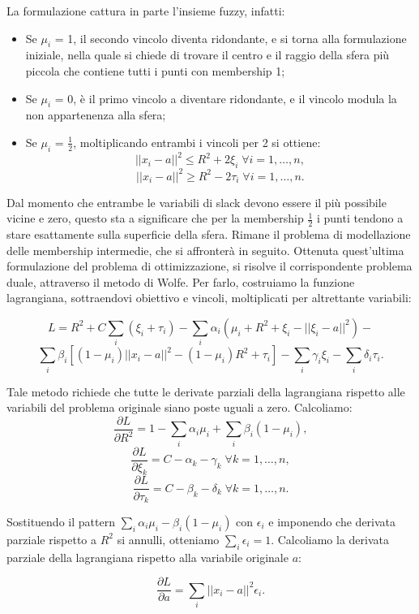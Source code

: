 \documentclass[12pt,a4paper]{report}
\begin{document}
La formulazione cattura in parte l'insieme fuzzy, infatti:
\begin{itemize}
  \item Se  $\mu_i$ = 1, il secondo vincolo diventa ridondante, e si torna alla formulazione iniziale, nella quale si chiede di trovare il centro  e il raggio della sfera più piccola che contiene tutti i punti con membership 1;
  \item Se   $\mu_i$ = 0, è il primo vincolo a diventare ridondante, e il vincolo modula la non appartenenza alla sfera;		
  \item Se   $\mu_i$ = $\frac{1}{2}$, moltiplicando entrambi i vincoli per 2 si ottiene:
\[ ||x_i - a||^2  \leq R^2 + 2\xi_{i} \; \forall i = 1, \dots, n,\]
\[ ||x_i - a||^2  \geq R^2 - 2\tau_{i}\; \forall i = 1, \dots, n.\]
\end{itemize}

Dal momento che entrambe le variabili di slack devono essere il più possibile vicine e zero, questo sta a significare che per la membership  $\frac{1}{2}$ i punti tendono a stare esattamente sulla superficie della sfera. Rimane il problema di modellazione delle membership intermedie, che si affronterà in seguito.
Ottenuta quest'ultima formulazione del problema di ottimizzazione, si risolve il corrispondente problema duale, attraverso il metodo di Wolfe. Per farlo, costruiamo la funzione lagrangiana, sottraendovi obiettivo e vincoli, moltiplicati per altrettante variabili:

\[ L = R^2 + C\sum_{i}(\xi_i + \tau_i) - \sum_{i}\alpha_i(\mu_i+R^2 + \xi_i - ||\xi_i - a||^2) -\] 
\[\sum_{i}\beta_i[(1- \mu_i)||x_i - a||^2 - (1 - \mu_i)R^2 + \tau_i] -  \sum_{i}\gamma_i\xi_i - \sum_{i}\delta_i\tau_i.\]

Tale metodo richiede che tutte le derivate parziali della lagrangiana rispetto alle variabili del problema originale siano poste uguali a zero. Calcoliamo:
\[ \frac{\partial L}{\partial R^2} = 1- \sum_{i}\alpha_i\mu_i + \sum_{i}\beta_i(1 - \mu_i),\]
\[ \frac{\partial L}{\partial \xi_k} = C - 	\alpha_k - \gamma_k  \; \forall k = 1, \dots, n,\]
\[ \frac{\partial L}{\partial \tau_k} = C - \beta_k - \delta_k  \; \forall k = 1, \dots, n.\]

Sostituendo il pattern $\sum_{i}\alpha_i\mu_i - \beta_i(1-\mu_i)$ con $\epsilon_i$ e imponendo che derivata parziale rispetto a $R^2$ si annulli, otteniamo $\sum_{i}\epsilon_i = 1$.
Calcoliamo la derivata parziale della lagrangiana rispetto alla variabile originale $a$:

\[ \frac{\partial L}{\partial a} = \sum_{i}||x_i - a||^2\epsilon_i.\]
\end{document}
